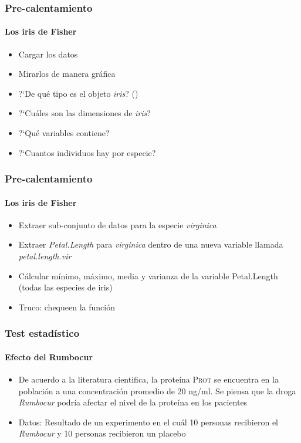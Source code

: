 \documentclass[mathserif]{beamer}
\begin{document}

\begin{frame}[plain,label=d35]%
\frametitle{Pre-calentamiento}
\framesubtitle{Los iris de Fisher}
\begin{itemize}
   \item Cargar los datos 
   \item Mirarlos de manera gr\'afica
   \item ?`De qu\'e tipo es el objeto \emph{iris}?  ()
   \item ?`Cu\'ales son las dimensiones de \emph{iris}?
   \item ?`Qu\'e variables contiene?
   \item ?`Cuantos individuos hay por especie?
\end{itemize}
\end{frame}%

\begin{frame}[plain,label=d36]%
\frametitle{Pre-calentamiento}
\framesubtitle{Los iris de Fisher}
\begin{itemize}
   \item Extraer sub-conjunto de datos para la especie \emph{virginica}
   \item Extraer \emph{Petal.Length} para \emph{virginica} dentro de una nueva variable llamada \emph{petal.length.vir}
   \item C\'alcular m\'inimo, m\'aximo, media y varianza de la variable Petal.Length (todas las especies de iris)
   \item \alert{Truco:} chequeen la funci\'on 
\end{itemize}
\end{frame}%

\begin{frame}[plain,label=d37]%
\frametitle{Test estad\'istico}
\framesubtitle{Efecto del Rumbocur}
\begin{itemize}
   \item De acuerdo a la literatura cientifica, la prote\'ina \textsc{Prot} se encuentra en la poblaci\'on a una concentraci\'on promedio de 20 ng/ml. Se piensa que la droga \emph{Rumbocur} podr\'ia afectar el nivel de la prote\'ina en los pacientes
   \item Datos: Resultado de un experimento en el cu\'al 10 personas recibieron el \emph{Rumbocur} y 10 personas recibieron un placebo
\end{itemize}
\end{frame}%
\end{document}
